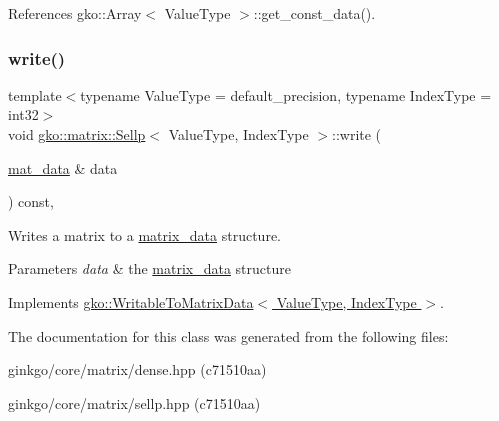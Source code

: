 References gko\+::\+Array$<$ Value\+Type $>$\+::get\+\_\+const\+\_\+data().

\mbox{\label{classgko_1_1matrix_1_1Sellp_aae2355a2866318b154d017b1c51f30a5}} 
\subsubsection{\texorpdfstring{write()}{write()}}
{\footnotesize\ttfamily template$<$typename Value\+Type = default\+\_\+precision, typename Index\+Type = int32$>$ \\
void \hyperlink{classgko_1_1matrix_1_1Sellp}{gko\+::matrix\+::\+Sellp}$<$ Value\+Type, Index\+Type $>$\+::write (\begin{DoxyParamCaption}\item[{\hyperlink{structgko_1_1matrix__data}{mat\+\_\+data} \&}]{data }\end{DoxyParamCaption}) const\hspace{0.3cm}{\ttfamily [override]}, {\ttfamily [virtual]}}



Writes a matrix to a \hyperlink{structgko_1_1matrix__data}{matrix\+\_\+data} structure. 


\begin{DoxyParams}{Parameters}
{\em data} & the \hyperlink{structgko_1_1matrix__data}{matrix\+\_\+data} structure \\
\hline
\end{DoxyParams}


Implements \hyperlink{classgko_1_1WritableToMatrixData_a96036c3a4bf4c67fa93002808b8b14e2}{gko\+::\+Writable\+To\+Matrix\+Data$<$ Value\+Type, Index\+Type $>$}.



The documentation for this class was generated from the following files\+:\begin{DoxyCompactItemize}
\item 
ginkgo/core/matrix/dense.\+hpp (c71510aa)\item 
ginkgo/core/matrix/sellp.\+hpp (c71510aa)\end{DoxyCompactItemize}
